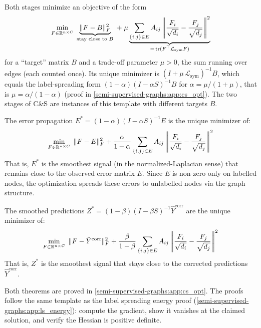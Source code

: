 \begin{notechapter}
Both stages minimize an objective of the form
\begin{equation}
\label{semi-supervised-graphs:eq:cs_general_opt}
\min_{F \in \R^{n \times C}}\;
\underbrace{\|F - B\|_F^2}_{\text{stay close to }B}
\;+\; \mu \underbrace{\sum_{\{i,j\}\in E}A_{ij}
\left\|\frac{F_i}{\sqrt{d_i}} - \frac{F_j}{\sqrt{d_j}}\right\|^2}_{
\mathclap{=\,\tr(F^\top \mathcal{L}_{\mathrm{sym}} F)}}
\end{equation}
for a ``target'' matrix $B$ and a trade-off parameter $\mu > 0$, the sum running over edges (each counted once). Its unique minimizer is $(I + \mu\,\mathcal{L}_{\mathrm{sym}})^{-1}B$, which equals the label-spreading form $(1-\alpha)(I - \alpha S)^{-1}B$ for $\alpha = \mu/(1+\mu)$, that is $\mu = \alpha/(1-\alpha)$ (proof in \cref{semi-supervised-graphs:app:cs_opt}). The two stages of C\&S are instances of this template with different targets $B$.

\begin{theorem}
\label{semi-supervised-graphs:thm:cs_correct_opt}
The error propagation $E^* = (1-\alpha)(I - \alpha S)^{-1}E$ is the unique
minimizer of:
\begin{equation}
\min_{F \in \mathbb{R}^{n \times C}}\; \|F - E\|_F^2
  + \frac{\alpha}{1-\alpha}\sum_{\{i,j\}\in E}A_{ij}
  \left\|\frac{F_i}{\sqrt{d_i}} - \frac{F_j}{\sqrt{d_j}}\right\|^2
\end{equation}
That is, $E^*$ is the smoothest signal (in the normalized-Laplacian sense) that
remains close to the observed error matrix $E$. Since $E$ is non-zero only on
labelled nodes, the optimization spreads these errors to unlabelled nodes via the
graph structure.
\end{theorem}

\begin{theorem}
\label{semi-supervised-graphs:thm:cs_smooth_opt}
The smoothed predictions $Z^* = (1-\beta)(I - \beta S)^{-1}\hat{Y}^{\text{corr}}$
are the unique minimizer of:
\begin{equation}
\min_{F \in \mathbb{R}^{n \times C}}\; \|F - \hat{Y}^{\text{corr}}\|_F^2
  + \frac{\beta}{1-\beta}\sum_{\{i,j\}\in E}A_{ij}
  \left\|\frac{F_i}{\sqrt{d_i}} - \frac{F_j}{\sqrt{d_j}}\right\|^2
\end{equation}
That is, $Z^*$ is the smoothest signal that stays close to the corrected
predictions $\hat{Y}^{\text{corr}}$.
\end{theorem}

Both theorems are proved in \cref{semi-supervised-graphs:app:cs_opt}. The proofs follow the
same template as the label spreading energy proof
(\cref{semi-supervised-graphs:app:ls_energy}): compute the gradient, show it vanishes at the
claimed solution, and verify the Hessian is positive definite.


\end{notechapter}
